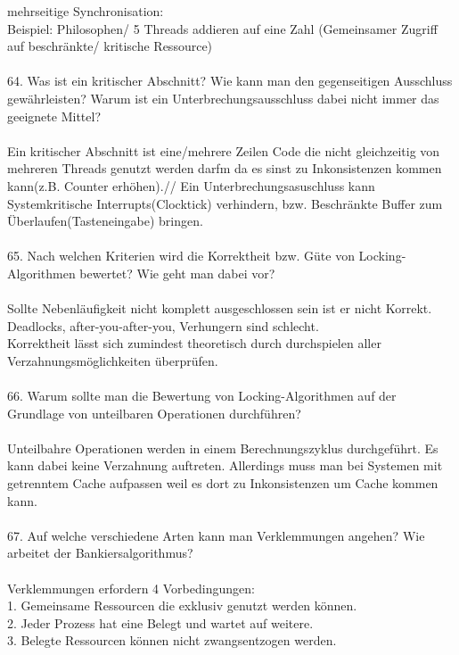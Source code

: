 \documentclass{article}
\newcommand\tab[1][1cm]{\hspace*{#1}}
\begin{document}
mehrseitige Synchronisation:\\
\tab 
Beispiel: Philosophen/ 5 Threads addieren auf eine Zahl (Gemeinsamer Zugriff auf beschr\"ankte/ kritische Ressource)
\\
\\
64. Was ist ein kritischer Abschnitt? Wie kann man den gegenseitigen Ausschluss gewährleisten?
Warum ist ein Unterbrechungsausschluss dabei nicht immer das geeignete Mittel?
\\
\\
Ein kritischer Abschnitt ist eine/mehrere Zeilen Code die nicht gleichzeitig von mehreren Threads genutzt werden darfm da es sinst zu Inkonsistenzen kommen kann(z.B. Counter erh\"ohen).//
Ein Unterbrechungsasuschluss kann Systemkritische Interrupts(Clocktick) verhindern, bzw. Beschr\"ankte Buffer zum \"Uberlaufen(Tasteneingabe) bringen.
\\
\\
65. Nach welchen Kriterien wird die Korrektheit bzw. Güte von Locking-Algorithmen bewertet?
Wie geht man dabei vor?
\\
\\
Sollte Nebenl\"aufigkeit nicht komplett ausgeschlossen sein ist er nicht Korrekt.\\
Deadlocks, after-you-after-you, Verhungern sind schlecht.\\
Korrektheit l\"asst sich zumindest theoretisch durch durchspielen aller  Verzahnungsm\"oglichkeiten \"uberpr\"ufen.
\\
\\
66. Warum sollte man die Bewertung von Locking-Algorithmen auf der Grundlage von unteilbaren Operationen durchführen?
\\
\\
Unteilbahre Operationen werden in einem Berechnungszyklus durchgef\"uhrt. Es kann dabei keine Verzahnung auftreten.
Allerdings muss man bei Systemen mit getrenntem Cache aufpassen weil es dort zu Inkonsistenzen um Cache kommen kann.
\\
\\
67. Auf welche verschiedene Arten kann man Verklemmungen angehen? Wie arbeitet der
Bankiersalgorithmus?
\\
\\
Verklemmungen erfordern 4 Vorbedingungen:\\
1. Gemeinsame Ressourcen die exklusiv genutzt werden k\"onnen.\\
2. Jeder Prozess hat eine Belegt und wartet auf weitere.\\
3. Belegte Ressourcen k\"onnen nicht zwangsentzogen werden.\\
\end{document}
